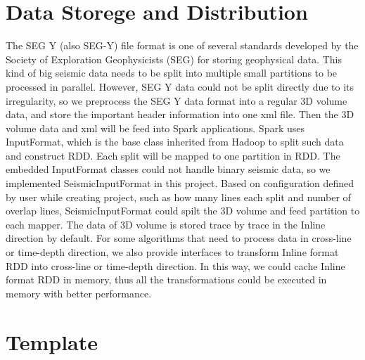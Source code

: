 \section{Data Storege and Distribution}

The SEG Y (also SEG-Y) \cite{} file format is one of several standards developed by the Society of Exploration Geophysicists (SEG) for storing geophysical data. This kind of big seismic data needs to be split into multiple small partitions to be processed in parallel. However, SEG Y data could not be split directly due to its irregularity, so we preprocess the SEG Y data format into a regular 3D volume data, and store the important header information into one xml file. Then the 3D volume data and xml will be feed into Spark applications. Spark uses InputFormat, which is the base class inherited from Hadoop to split such data and construct RDD. Each split will be mapped to one partition in RDD. The embedded InputFormat classes could not handle binary seismic data, so we implemented SeismicInputFormat in this project.  Based on configuration defined by user while creating project, such as how many lines each split and number of overlap lines, SeismicInputFormat could spilt the 3D volume and feed partition to each mapper. The data of 3D volume is stored trace by trace in the Inline direction by default. For some algorithms that need to process data in cross-line or time-depth direction, we also provide interfaces to transform Inline format RDD into cross-line or time-depth direction. In this way, we could cache Inline format RDD in memory, thus all the transformations could be executed in memory with better performance.



\section{Template}

